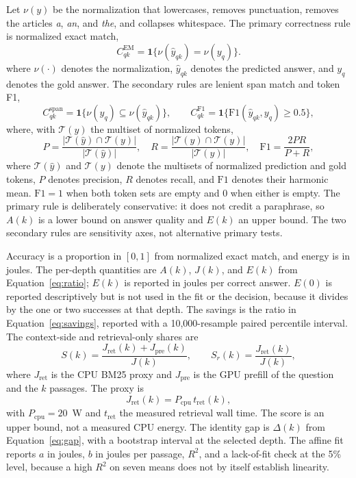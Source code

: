 \documentclass[a4paper,fleqn]{cas-sc}
\begin{document}
Let $\nu(y)$ be the normalization that lowercases, removes punctuation, removes the articles \emph{a}, \emph{an}, and \emph{the}, and collapses whitespace. The primary correctness rule is normalized exact match,
\begin{equation}\label{eq:em}
  C_{qk}^{\mathrm{EM}}=\mathbf{1}\{\nu(\hat y_{qk})=\nu(y_{q})\}.
\end{equation}
where $\nu(\cdot)$ denotes the normalization, $\hat y_{qk}$ denotes the predicted answer, and $y_{q}$ denotes the gold answer. The secondary rules are lenient span match and token F1,
\begin{equation}\label{eq:lenient}
  C_{qk}^{\mathrm{span}}=\mathbf{1}\{\nu(y_{q})\subseteq\nu(\hat y_{qk})\},
  \qquad
  C_{qk}^{\mathrm{F1}}=\mathbf{1}\{\mathrm{F1}(\hat y_{qk},y_{q})\ge0.5\},
\end{equation}
where, with $\mathcal{T}(y)$ the multiset of normalized tokens,
\begin{equation}\label{eq:f1}
  P=\frac{|\mathcal{T}(\hat y)\cap\mathcal{T}(y)|}{|\mathcal{T}(\hat y)|},
  \quad
  R=\frac{|\mathcal{T}(\hat y)\cap\mathcal{T}(y)|}{|\mathcal{T}(y)|},
  \quad
  \mathrm{F1}=\frac{2PR}{P+R},
\end{equation}
where $\mathcal{T}(\hat y)$ and $\mathcal{T}(y)$ denote the multisets of normalized prediction and gold tokens, $P$ denotes precision, $R$ denotes recall, and $\mathrm{F1}$ denotes their harmonic mean. $\mathrm{F1}=1$ when both token sets are empty and $0$ when either is empty. The primary rule is deliberately conservative: it does not credit a paraphrase, so $A(k)$ is a lower bound on answer quality and $E(k)$ an upper bound. The two secondary rules are sensitivity axes, not alternative primary tests.

Accuracy is a proportion in $[0,1]$ from normalized exact match, and energy is in joules. The per-depth quantities are $A(k)$, $J(k)$, and $E(k)$ from Equation~\eqref{eq:ratio}; $E(k)$ is reported in joules per correct answer. $E(0)$ is reported descriptively but is not used in the fit or the decision, because it divides by the one or two successes at that depth. The savings is the ratio in Equation~\eqref{eq:savings}, reported with a 10{,}000-resample paired percentile interval. The context-side and retrieval-only shares are
\begin{equation}\label{eq:shares}
  S(k)=\frac{J_{\mathrm{ret}}(k)+J_{\mathrm{pre}}(k)}{J(k)},
  \qquad
  S_{r}(k)=\frac{J_{\mathrm{ret}}(k)}{J(k)},
\end{equation}
where $J_{\mathrm{ret}}$ is the CPU BM25 proxy and $J_{\mathrm{pre}}$ is the GPU prefill of the question and the $k$ passages. The proxy is
\begin{equation}\label{eq:proxy}
  J_{\mathrm{ret}}(k)=P_{\mathrm{cpu}}\,t_{\mathrm{ret}}(k),
\end{equation}
with $P_{\mathrm{cpu}}=20$~W and $t_{\mathrm{ret}}$ the measured retrieval wall time. The score is an upper bound, not a measured CPU energy. The identity gap is $\Delta(k)$ from Equation~\eqref{eq:gap}, with a bootstrap interval at the selected depth. The affine fit reports $a$ in joules, $b$ in joules per passage, $R^{2}$, and a lack-of-fit check at the 5\% level, because a high $R^{2}$ on seven means does not by itself establish linearity.
\end{document}
